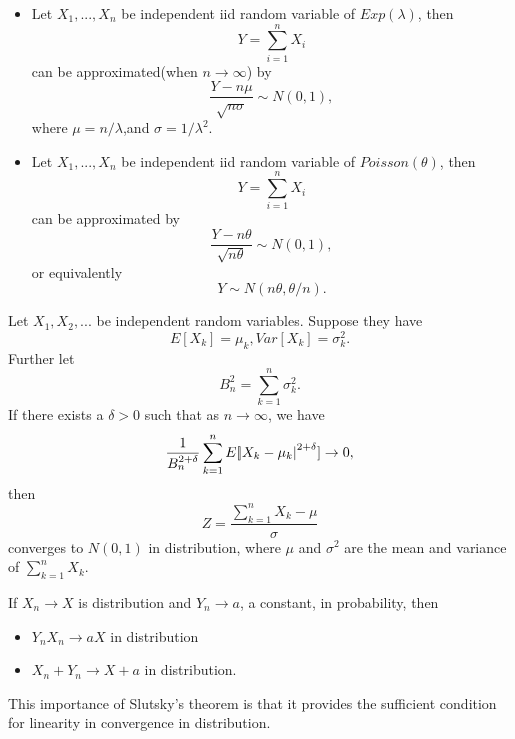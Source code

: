 \begin{refsection}
\begin{example}\hfill
\begin{itemize}
	\item Let $X_1,...,X_n$ be independent iid random variable of $Exp(\lambda)$, then
	$$Y = \sum_{i=1}^n X_i$$
	can be approximated(when $n\to \infty$) by $$\frac{Y - n\mu}{\sqrt{n\sigma}}\sim N(0,1),$$
	where $\mu = n/\lambda$,and $\sigma = 1/\lambda^2$.
	\item Let $X_1,...,X_n$ be independent iid random variable of $Poisson(\theta)$, then
	$$Y = \sum_{i=1}^n X_i$$
	can be approximated by $$\frac{Y - n\theta}{\sqrt{n\theta}}\sim N(0,1),$$
	or equivalently
	$$Y \sim N(n\theta,\theta/n).$$
\end{itemize}
\end{example}

\begin{theorem}
Let $X_1,X_2,...$ be independent random variables. Suppose they have $$E[X_k] = \mu_k, Var[X_k] = \sigma_k^2.$$
Further let 
$$B_n^2  = \sum_{k=1}^n \sigma_k^2.$$
If there exists a $\delta >0$ such that as $n\to \infty$, we have
$$\frac{1}{B_n^{2+\delta}} \sum_{k=1}^n E[\abs{X_k-\mu_k}^{2+\delta}] \to 0,$$
then
$$Z = \frac{\sum_{k=1}^n X_k - \mu}{\sigma}$$
converges to $N(0,1)$ in distribution, where $\mu$ and $\sigma^2$ are the mean and variance of $\sum_{k=1}^n X_k$.
	
\end{theorem}

\begin{lemma}\cite[239]{casella2002statistical}
If $X_n\to X$ is distribution and $Y_n \to a$, a constant, in probability, then
\begin{itemize}
	\item $Y_nX_n \to aX$ in distribution\\
	\item $X_n + Y_n \to X + a$ in distribution.
\end{itemize} 
\end{lemma}

\begin{remark}
This importance of Slutsky's theorem is that it provides the sufficient condition for linearity in convergence in distribution.
\end{remark}



\end{refsection}
